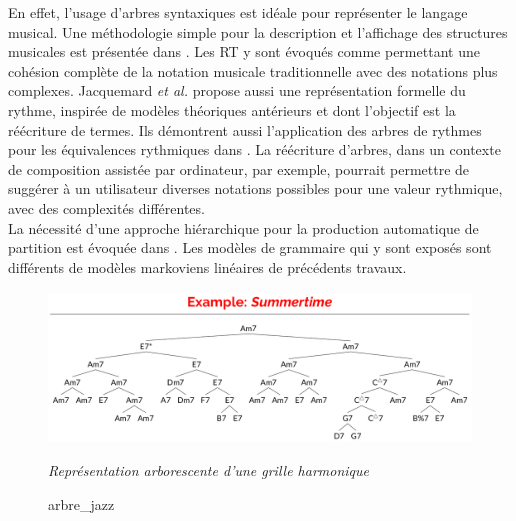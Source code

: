 En effet, l’usage d’arbres syntaxiques est idéale pour représenter le langage musical. Une méthodologie simple pour la description et l'affichage des structures musicales est présentée dans \cite{rythm_tree}. Les RT y sont évoqués comme permettant une cohésion complète de la notation musicale traditionnelle avec des notations plus complexes. Jacquemard \textit{et al.} \cite{jacquemard:hal-01134096} propose aussi une représentation formelle du rythme, inspirée de modèles théoriques antérieurs et dont l’objectif est la réécriture de termes. Ils démontrent aussi l’application des arbres de rythmes pour les équivalences rythmiques dans \cite{jacquemard:hal-01403982}. La réécriture d’arbres, dans un contexte de composition assistée par ordinateur, par exemple, pourrait permettre de suggérer à un utilisateur diverses notations possibles pour une valeur rythmique, avec des complexités différentes.\\La nécessité d’une approche hiérarchique pour la production automatique de partition est évoquée dans \cite{foscarin:hal-01988990}. Les modèles de grammaire qui y sont exposés sont différents de modèles markoviens linéaires de précédents travaux.\newpage
\begin{figure}[h]
	\centering
	\includegraphics[height=40mm, width=120mm]{z_images/2_etat_de_l_art/1_summertime_tree.png}
	\caption{arbre\_jazz}
	\textit{Représentation arborescente d’une grille harmonique} \cite{harasimjazz}
\end{figure}
